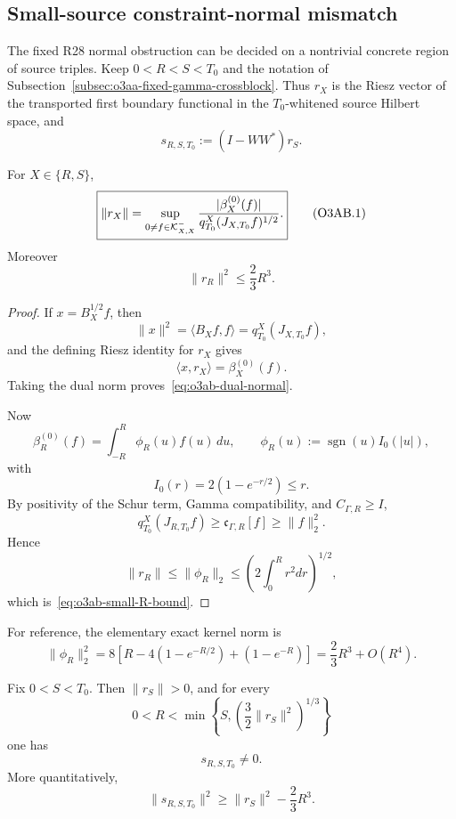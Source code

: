
\subsection{Small-source constraint-normal mismatch}
\label{subsec:o3ab-small-source-normal}

The fixed R28 normal obstruction can be decided on a nontrivial concrete region of source triples.  Keep $0<R<S<T_0$ and the notation of Subsection~\ref{subsec:o3aa-fixed-gamma-crossblock}.  Thus $r_X$ is the Riesz vector of the transported first boundary functional in the $T_0$-whitened source Hilbert space, and
\[
 s_{R,S,T_0}:=(I-WW^*)r_S.
\]

\begin{proposition}
\label{prop:o3ab-dual-normal}
For $X\in\{R,S\}$,
\[
 \boxed{
 \|r_X\|
 =\sup_{0\ne f\in\mathcal K_{X,X}^-}
 \frac{|\beta_X^{(0)}(f)|}
 {q_{T_0}^X(J_{X,T_0}f)^{1/2}}.
 }
\tag{O3AB.1}\label{eq:o3ab-dual-normal}
\]
Moreover
\[
 \boxed{
 \|r_R\|^2\le\frac23R^3.
 }
\tag{O3AB.2}\label{eq:o3ab-small-R-bound}
\]
\end{proposition}

\begin{proof}
If $x=B_X^{1/2}f$, then
\[
 \|x\|^2=\langle B_Xf,f\rangle
 =q_{T_0}^X(J_{X,T_0}f),
\]
and the defining Riesz identity for $r_X$ gives
\[
 \langle x,r_X\rangle=\beta_X^{(0)}(f).
\]
Taking the dual norm proves~\eqref{eq:o3ab-dual-normal}.

Now
\[
 \beta_R^{(0)}(f)
 =\int_{-R}^R\phi_R(u)f(u)\,du,
 \qquad
 \phi_R(u):=\operatorname{sgn}(u)I_0(|u|),
\]
with
\[
 I_0(r)=2(1-e^{-r/2})\le r.
\]
By positivity of the Schur term, Gamma compatibility, and
$C_{\Gamma,R}\ge I$,
\[
 q_{T_0}^X(J_{R,T_0}f)
 \ge\mathfrak c_{\Gamma,R}[f]
 \ge\|f\|_2^2.
\]
Hence
\[
 \|r_R\|\le\|\phi_R\|_2
 \le\left(2\int_0^Rr^2dr\right)^{1/2},
\]
which is~\eqref{eq:o3ab-small-R-bound}.
\end{proof}

For reference, the elementary exact kernel norm is
\[
 \|\phi_R\|_2^2
 =8\left[R-4(1-e^{-R/2})+(1-e^{-R})\right]
 =\frac23R^3+O(R^4).
\tag{O3AB.3}\label{eq:o3ab-exact-kernel-norm}
\]

\begin{theorem}
\label{thm:o3ab-small-source-mismatch}
Fix $0<S<T_0$.  Then $\|r_S\|>0$, and for every
\[
 0<R<\min\left\{S,
 \left(\frac32\|r_S\|^2\right)^{1/3}\right\}
\]
one has
\[
 \boxed{s_{R,S,T_0}\ne0.}
\tag{O3AB.4}\label{eq:o3ab-s-nonzero}
\]
More quantitatively,
\[
 \boxed{
 \|s_{R,S,T_0}\|^2
 \ge\|r_S\|^2-\frac23R^3.
 }
\tag{O3AB.5}\label{eq:o3ab-s-lower}
\]
\end{theorem}

